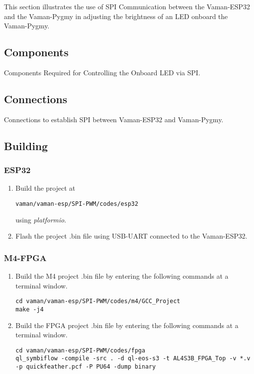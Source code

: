 This section illustrates the use of SPI Communication between the Vaman-ESP32
and the Vaman-Pygmy in adjusting the brightness of an LED onboard the 
Vaman-Pygmy.

\subsection{Components}
\begin{table}[!ht]
    \centering
    
    \caption{Components Required for Controlling the Onboard LED via SPI.}
    \label{tab:spi-pwm-components}
\end{table}

\subsection{Connections}
\begin{table}[!ht]
    \centering
    
    \caption{Connections to establish SPI between Vaman-ESP32 and Vaman-Pygmy.}
    \label{tab:spi-pwm-connections}
\end{table}

\subsection{Building}
\subsubsection{ESP32}
\begin{enumerate}
    \item Build the project at
    \begin{lstlisting}
vaman/vaman-esp/SPI-PWM/codes/esp32
    \end{lstlisting}
    using \emph{platformio}.
    \item Flash the project .bin file using USB-UART connected to the 
    Vaman-ESP32. 
\end{enumerate}

\subsubsection{M4-FPGA}
\begin{enumerate}
    \item Build the M4 project .bin file by entering the following commands at a
    terminal window.
    \begin{lstlisting}
cd vaman/vaman-esp/SPI-PWM/codes/m4/GCC_Project
make -j4
    \end{lstlisting}
    \item Build the FPGA project .bin file by entering the following commands at
    a terminal window.
    \begin{lstlisting}
cd vaman/vaman-esp/SPI-PWM/codes/fpga
ql_symbiflow -compile -src . -d ql-eos-s3 -t AL4S3B_FPGA_Top -v *.v -p quickfeather.pcf -P PU64 -dump binary
    \end{lstlisting}
\end{enumerate}


